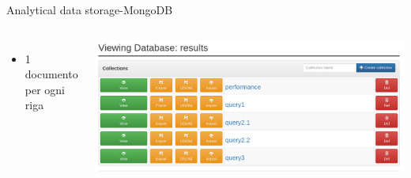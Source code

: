 \documentclass[13pt,aspectratio=169,t,xcolor=table]{beamer}
\begin{document}
\begin{frame}{Analytical data storage-MongoDB}
\begin{columns}
\begin{minipage}[b]{1\textwidth}
\begin{itemize}
                    \item 1 documento per ogni riga
                \end{itemize}
            \end{minipage}
            \begin{minipage}{1\textwidth}
                \begin{adjustbox}{margin=0cm 0cm 1.5cm 0cm, center}
                    \includegraphics[width=1\textwidth]{res/mongo.png}
                \end{adjustbox}
            \end{minipage}
    \end{columns}
\end{frame}

\end{document}
